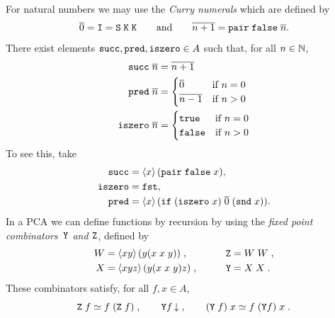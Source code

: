 %
For natural numbers we may use the
%
%
%
\label{sym:curry_numeral}%
%
\emph{Curry numerals} which are defined by 
%
\begin{equation*}
  \overline{0} = \mathtt{I} = \mathtt{S}\; \mathtt{K}\; \mathtt{K}
  \qquad\text{and}\qquad
  \overline{n+1} = \mathtt{pair} \; \mathtt{false} \; \overline{n}.
\end{equation*}
%
There exist elements
%
%
%
%
%
$\mathtt{succ}, \mathtt{pred}, \mathtt{iszero} \in A$ such that,
for all $n \in \mathbb{N}$,
%
\label{sym:succ}%
\label{sym:pred}%
\label{sym:iszero}%
%
\begin{align*}
  \mathtt{succ}\; \overline{n} &= \overline{n+1} \\
  \mathtt{pred}\; \overline{n} &= 
  \begin{cases}
    \overline{0} & \text{if $n = 0$} \\
    \overline{n-1} & \text{if $n > 0$}
  \end{cases}\\
  \mathtt{iszero}\; \overline{n} &=
  \begin{cases}
    \mathtt{true} & \text{if $n = 0$} \\
    \mathtt{false} & \text{if $n > 0$}
  \end{cases}
\end{align*}
%
To see this, take
%
\begin{align*}
  \mathtt{succ} &= \langle x \rangle\,(\mathtt{pair} \; \mathtt{false} \;x),\\ 
  \mathtt{iszero} &= \mathtt{fst},\\
  \mathtt{pred} &=
  \langle x \rangle\,(\mathtt{if}\; (\mathtt{iszero}\; x)\; \overline{0}\; (\mathtt{snd}\; x)).
\end{align*}
%
In a PCA we can define functions by recursion by using the
%
%
%
%
%
\label{sym:combY}%
\label{sym:combZ}%
\label{sym:combW}%
%
\emph{fixed point combinators~$\mathtt{Y}$ and $\mathtt{Z}$}, defined by
%
\begin{alignat*}{2}
  W &= \langle x y \rangle\,(y(x\; x\; y))\;, &
  \qquad
  \mathtt{Z} &= W\; W \;, \\
  X &= \langle x y z \rangle\,(y (x\; x\; y) z) \;, &
  \qquad
  \mathtt{Y} &= X\; X \;.
\end{alignat*}
%
These combinators satisfy, for all $f, x \in A$,
%
\begin{equation*}
  \mathtt{Z}\; f \simeq f\; (\mathtt{Z}\; f) \;,
  \qquad
  \mathtt{Y} f\,{\downarrow} \;,
  \qquad
  (\mathtt{Y}\; f)\; x \simeq f\; (\mathtt{Y} f)\; x \;.
\end{equation*}

